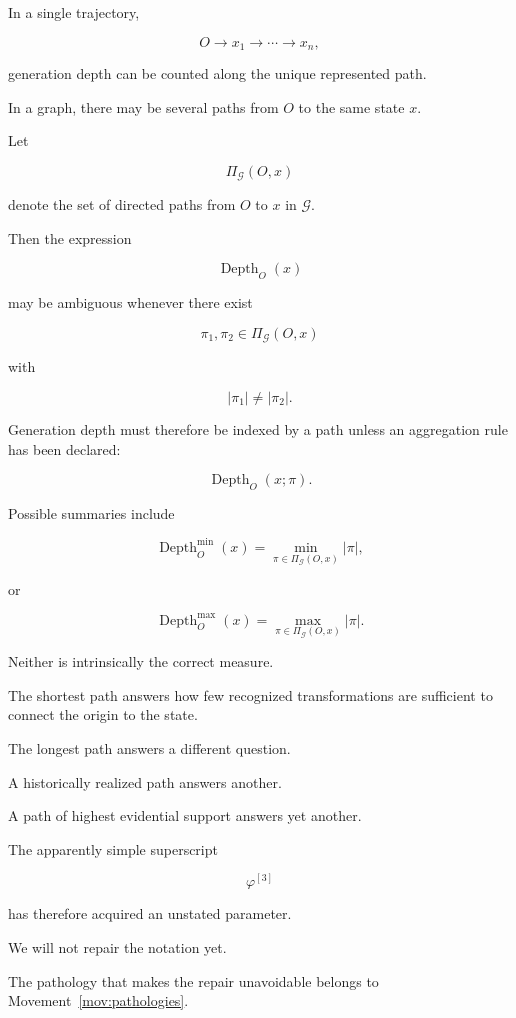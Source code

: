\documentclass[
  11pt,
  a4paper,
  DIV=12,
  BCOR=0mm,
  parskip=half-
]{scrartcl}
\newcommand{\graphG}{\mathcal G}
\newcommand{\Depth}{\operatorname{Depth}}
\theoremstyle{definition}
\theoremstyle{plain}
\theoremstyle{remark}
\begin{document}
In a single trajectory,

\[
  O
  \to
  x_1
  \to
  \cdots
  \to
  x_n,
\]

generation depth can be counted along the unique represented path.

In a graph, there may be several paths from \(O\) to the same state \(x\).

Let

\[
  \Pi_{\graphG}(O,x)
\]

denote the set of directed paths from \(O\) to \(x\) in \(\graphG\).

Then the expression

\[
  \Depth_O(x)
\]

may be ambiguous whenever there exist

\[
  \pi_1,\pi_2\in\Pi_{\graphG}(O,x)
\]

with

\[
  |\pi_1|\neq|\pi_2|.
\]

Generation depth must therefore be indexed by a path unless an aggregation
rule has been declared:

\[
  \Depth_O(x;\pi).
\]

Possible summaries include

\[
  \Depth_O^{\min}(x)
  =
  \min_{\pi\in\Pi_{\graphG}(O,x)}
  |\pi|,
\]

or

\[
  \Depth_O^{\max}(x)
  =
  \max_{\pi\in\Pi_{\graphG}(O,x)}
  |\pi|.
\]

Neither is intrinsically the correct measure.

The shortest path answers how few recognized transformations are sufficient
to connect the origin to the state.

The longest path answers a different question.

A historically realized path answers another.

A path of highest evidential support answers yet another.

The apparently simple superscript

\[
  \varphi^{[3]}
\]

has therefore acquired an unstated parameter.

We will not repair the notation yet.

The pathology that makes the repair unavoidable belongs to
Movement~\ref{mov:pathologies}.

\end{document}

